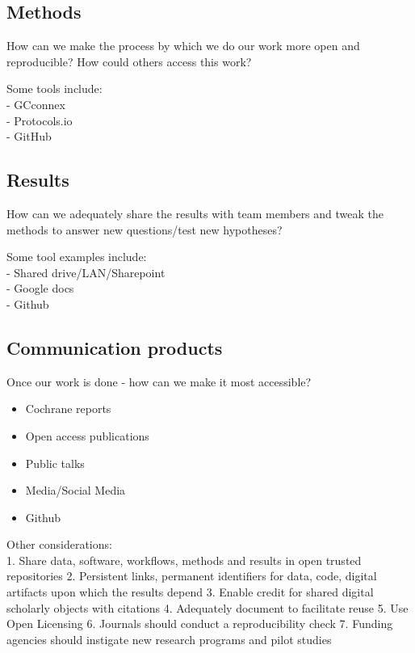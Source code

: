 \documentclass[
]{book}
\providecommand{\tightlist}{%
  \setlength{\itemsep}{0pt}\setlength{\parskip}{0pt}}
\begin{document}
\hypertarget{methods}{%
\subsection{Methods}\label{methods}}

How can we make the process by which we do our work more open and reproducible? How could others access this work?

Some tools include:\\
- GCconnex\\
- Protocols.io\\
- GitHub

\hypertarget{results}{%
\subsection{Results}\label{results}}

How can we adequately share the results with team members and tweak the methods to answer new questions/test new hypotheses?

Some tool examples include:\\
- Shared drive/LAN/Sharepoint\\
- Google docs\\
- Github

\hypertarget{communication-products}{%
\subsection{Communication products}\label{communication-products}}

Once our work is done - how can we make it most accessible?

\begin{itemize}
\tightlist
\item
  Cochrane reports\\
\item
  Open access publications\\
\item
  Public talks\\
\item
  Media/Social Media\\
\item
  Github
\end{itemize}

Other considerations:\\
1. Share data, software, workflows, methods and results in open trusted repositories
2. Persistent links, permanent identifiers for data, code, digital artifacts upon which the results depend
3. Enable credit for shared digital scholarly objects with citations
4. Adequately document to facilitate reuse
5. Use Open Licensing
6. Journals should conduct a reproducibility check
7. Funding agencies should instigate new research programs and pilot studies
\end{document}
